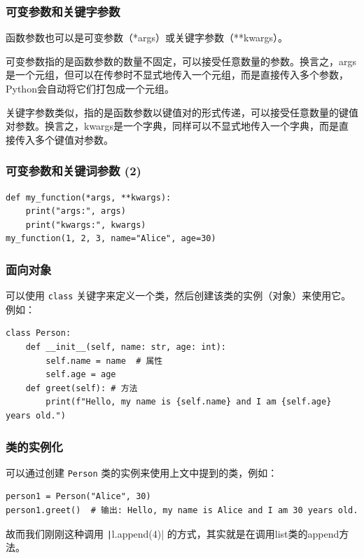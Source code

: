 \begin{frame}[fragile]
    \frametitle{可变参数和关键字参数}

    函数参数也可以是可变参数（*args）或关键字参数（**kwargs）。

    可变参数指的是函数参数的数量不固定，可以接受任意数量的参数。换言之，args是一个元组，但可以在传参时不显式地传入一个元组，而是直接传入多个参数，Python会自动将它们打包成一个元组。

    关键字参数类似，指的是函数参数以键值对的形式传递，可以接受任意数量的键值对参数。换言之，kwargs是一个字典，同样可以不显式地传入一个字典，而是直接传入多个键值对参数。

\end{frame}

\begin{frame}[fragile]
    \frametitle{可变参数和关键词参数 (2)}

\begin{verbatim}
def my_function(*args, **kwargs):
    print("args:", args)
    print("kwargs:", kwargs)
my_function(1, 2, 3, name="Alice", age=30)
\end{verbatim}

\end{frame}

\begin{frame}[fragile]
    \frametitle{面向对象}

    可以使用 \texttt{class} 关键字来定义一个类，然后创建该类的实例（对象）来使用它。例如：
    \begin{verbatim}
class Person:
    def __init__(self, name: str, age: int):
        self.name = name  # 属性
        self.age = age
    def greet(self): # 方法
        print(f"Hello, my name is {self.name} and I am {self.age} years old.")
    \end{verbatim}

\end{frame}

\begin{frame}[fragile]
    \frametitle{类的实例化}

    可以通过创建 \texttt{Person} 类的实例来使用上文中提到的类，例如：
    \begin{verbatim}
person1 = Person("Alice", 30)
person1.greet()  # 输出: Hello, my name is Alice and I am 30 years old.
    \end{verbatim}
    故而我们刚刚这种调用 \texttt|l.append(4)| 的方式，其实就是在调用list类的append方法。

\end{frame}

